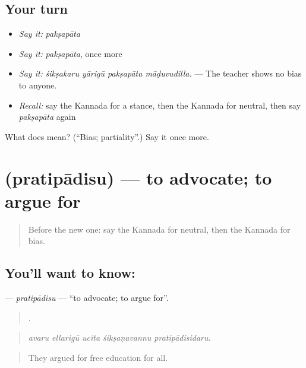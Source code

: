 \subsection*{Your turn}
\begin{itemize}
\raggedright
  \item \emph{Say it:} \emph{pakṣapāta}
  \item \emph{Say it:} \emph{pakṣapāta}, once more
  \item \emph{Say it:} \emph{śikṣakaru yārigū pakṣapāta māḍuvudilla.} — The teacher shows no bias to anyone.
  \item \emph{Recall:} say the Kannada for a stance, then the Kannada for neutral, then say \emph{pakṣapāta} again
\end{itemize}

\begin{tcolorbox}[breakable,colback=teal!4,colframe=teal!35!black,title={Before you move on}]
What does  mean? (\textquotedblleft{}Bias; partiality\textquotedblright{}.) Say it once more.
\end{tcolorbox}
\section[\texorpdfstring{\kn{ಪ್ರತಿಪಾದಿಸು} (pratipādisu)}{ಪ್ರತಿಪಾದಿಸು (pratipādisu)}]{ (pratipādisu) — to advocate; to argue for}

\label{lesson:KA-C378-pratipadisu}



\begin{quote}
Before the new one: say the Kannada for neutral, then the Kannada for bias.
\end{quote}

\subsection*{You'll want to know: }
\textbf{} — \emph{pratipādisu} — \textquotedblleft{}to advocate; to argue for\textquotedblright{}.

\begin{quote}
    .
\end{quote}

\begin{quote}
\emph{avaru ellarigū ucita śikṣaṇavannu pratipādisidaru.}
\end{quote}

\begin{quote}
They argued for free education for all.
\end{quote}

